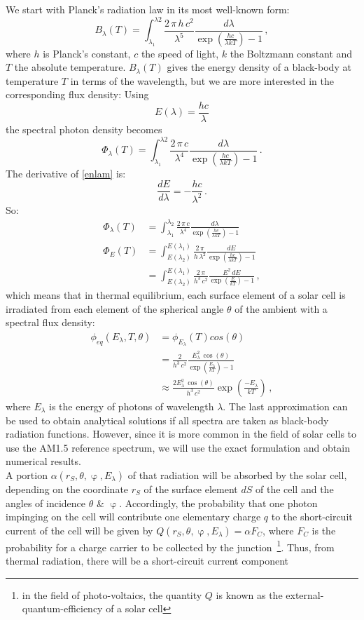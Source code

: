 \documentclass[a4paper]{article}
\newcommand{\beq}{\begin{equation}}
\newcommand{\eeq}{\end{equation}}
\begin{document}
We start with Planck's radiation law in its most well-known form:
\beq
B_{\lambda} (T) = \int _{\lambda_1} ^{\lambda 2} \frac{2  \,  \pi  \, h  \, c^2}{\lambda ^5} \frac{d\lambda}{\exp(\frac{hc}{\lambda kT})-1} \, ,
\eeq
where $h$ is Planck's constant, $c$ the speed of light, $k$ the Boltzmann constant and $T$ the absolute temperature. $B_{\lambda} (T)$ gives the energy density of a black-body at temperature $T$ in terms of the wavelength, but we are more interested in the corresponding flux density: Using
\beq
\label{enlam}
E(\lambda)=\frac{hc}{\lambda}
\eeq
the spectral photon density becomes
\beq
\label{photlam}
\Phi_{\lambda} (T) = \int _{\lambda_1} ^{\lambda 2} \frac{2  \,  \pi  \, c}{\lambda ^4} \frac{d\lambda}{\exp(\frac{hc}{\lambda kT})-1} \, .
\eeq
The derivative of \eqref{enlam} is:
\beq
\frac{dE}{d\lambda}=-\frac{hc}{\lambda^2} \, .
\eeq
So:
\begin{align}
\Phi_{\lambda} (T) &= \int _{\lambda _1} ^{\lambda _2} \frac{2  \,  \pi  \, c}{\lambda ^4} \frac{d\lambda}{\exp(\frac{hc}{\lambda kT})-1} \\
\Phi_{E} (T)	&=\int _{E(\lambda _2)} ^{E(\lambda_1)} \frac{2 \, \pi }{h \, \lambda ^2} \frac{dE}{\exp(\frac{hc}{\lambda kT})-1} \\
		&=\int _{E(\lambda _2)} ^{E(\lambda_1)} \frac{2  \,  \pi}{h^3 \, c^2} \frac{E ^2 \, dE}{\exp(\frac{E}{kT})-1} \, ,
\end{align}
which means that in thermal equilibrium, each surface element of a solar cell is irradiated from each element of the spherical angle $\theta$ of the ambient with a spectral flux density:
\begin{align}
\phi _{eq} (E_{\lambda},T,\theta)&=\phi_{E_{\lambda}}(T)cos(\theta)\\
				&=\frac{2 }{h^3 \, c^2} \frac{E_{\lambda} ^2 \, \cos (\theta)}{\exp(\frac{E_{\lambda}}{kT})-1} \\
				&\approx \frac{2 E_{\lambda} ^2 \, \cos (\theta)}{h^3 \, c^2} \exp (\frac{-E_{\lambda}}{kT}) \, ,
\end{align}
where $E_{\lambda}$ is the energy of photons of wavelength $\lambda$. The last approximation can be used to obtain analytical solutions if all spectra are taken as black-body radiation functions. However, since it is more common in the field of solar cells to use the AM1.5 reference spectrum, we will use the exact formulation and obtain numerical results.\\
A portion $\alpha (r_S, \theta, \upvarphi, E_{\lambda})$ of that radiation will be absorbed by the solar cell, depending on the coordinate $r_S$ of the surface element $dS$ of the cell and the angles of incidence $\theta$ \& $\upvarphi$. Accordingly, the probability that one photon impinging on the cell will contribute one elementary charge $q$ to the short-circuit current of the cell will be given by $Q(r_S, \theta, \upvarphi, E_{\lambda})=\alpha F_C$, where $F_C$ is the probability for a charge carrier to be collected by the junction~\footnote{in the field of photo-voltaics, the quantity $Q$ is known as the external-quantum-efficiency of a solar cell}. Thus, from thermal radiation, there will be a short-circuit current component
\end{document}
